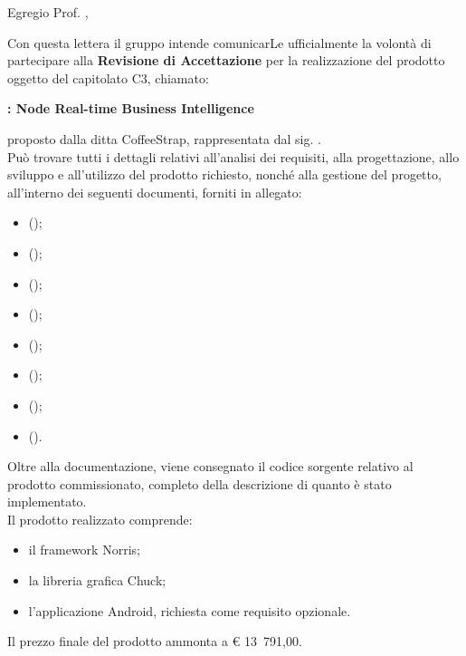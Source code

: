 \documentclass{letter}
\begin{document}
\begin{letter}{}

	\vspace{4cm}
	
	\opening{Egregio Prof. \committente{},}
	
	Con questa lettera il gruppo \groupname{} intende comunicarLe ufficialmente la volontà di partecipare alla \textbf{Revisione di Accettazione} per la realizzazione del prodotto oggetto del capitolato C3, chiamato:
	\begin{center}
		\textbf{\projectname{}: Node Real-time Business Intelligence}
	\end{center}
	proposto dalla ditta CoffeeStrap, rappresentata dal sig. \proponente{}.\\
	Può trovare tutti i dettagli relativi all'analisi dei requisiti, alla progettazione, allo sviluppo e all'utilizzo del prodotto richiesto, nonché alla gestione del progetto, all'interno dei seguenti documenti, forniti in allegato:

	\begin{itemize}
		\item {} ();
		\item {} ();
		\item {} ();
		\item {} ();
		\item {} ();
		\item {} ();
		\item {} ();
		\item {} ().
	\end{itemize}
	
	Oltre alla documentazione, viene consegnato il codice sorgente relativo al prodotto commissionato, completo della descrizione di quanto è stato implementato.\\
	Il prodotto realizzato comprende:
	\begin{itemize}
		\item il framework Norris;
		\item la libreria grafica Chuck;
		\item l'applicazione Android, richiesta come requisito opzionale.
	\end{itemize}
	Il prezzo finale del prodotto ammonta a \euro{} 13~791,00.
	

\end{letter}
\end{document}

